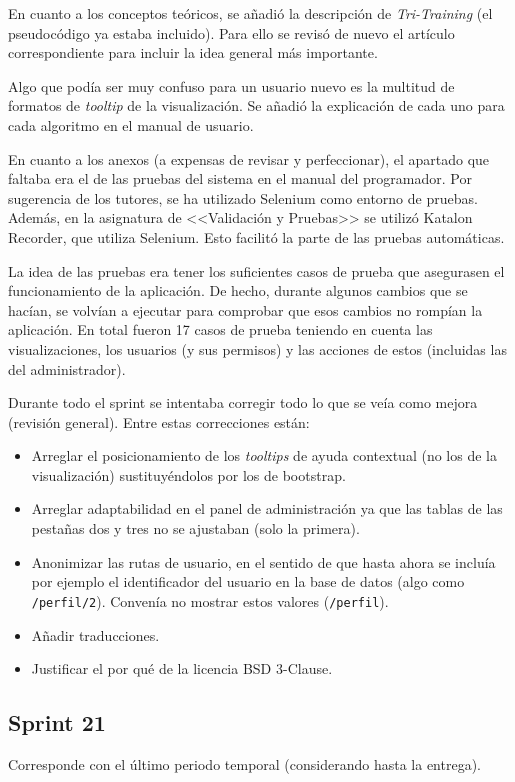 En cuanto a los conceptos teóricos, se añadió la descripción de
\textit{Tri-Training} (el pseudocódigo ya estaba incluido). Para ello se revisó
de nuevo el artículo correspondiente para incluir la idea general más
importante.

Algo que podía ser muy confuso para un usuario nuevo es la multitud de formatos
de \textit{tooltip} de la visualización. Se añadió la explicación de cada uno
para cada algoritmo en el manual de usuario.

En cuanto a los anexos (a expensas de revisar y perfeccionar), el apartado que
faltaba era el de las pruebas del sistema en el manual del programador. Por
sugerencia de los tutores, se ha utilizado Selenium como entorno de pruebas.
Además, en la asignatura de <<Validación y Pruebas>> se utilizó Katalon
Recorder, que utiliza Selenium. Esto facilitó la parte de las pruebas
automáticas.

La idea de las pruebas era tener los suficientes casos de prueba que asegurasen
el funcionamiento de la aplicación. De hecho, durante algunos cambios que se
hacían, se volvían a ejecutar para comprobar que esos cambios no rompían la
aplicación. En total fueron 17 casos de prueba teniendo en cuenta las
visualizaciones, los usuarios (y sus permisos) y las acciones de estos
(incluidas las del administrador).

Durante todo el sprint se intentaba corregir todo lo que se veía como mejora
(revisión general). Entre estas correcciones están:
\begin{itemize}
    \item Arreglar el posicionamiento de los \textit{tooltips} de ayuda
    contextual (no los de la visualización) sustituyéndolos por los de bootstrap.
    \item Arreglar adaptabilidad en el panel de administración ya que las tablas
    de las pestañas dos y tres no se ajustaban (solo la primera).
    \item Anonimizar las rutas de usuario, en el sentido de que hasta ahora se
    incluía por ejemplo el identificador del usuario en la base de datos (algo
    como \texttt{/perfil/2}). Convenía no mostrar estos valores
    (\texttt{/perfil}).
    \item Añadir traducciones.
    \item Justificar el por qué de la licencia BSD 3-Clause.
\end{itemize}

\subsection{Sprint 21}
Corresponde con el último periodo temporal (considerando hasta la entrega).

